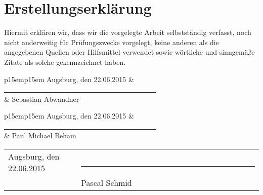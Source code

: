 \section*{Erstellungserklärung}
\vspace{2em}

Hiermit erklären wir, dass wir die vorgelegte Arbeit selbstständig verfasst, noch nicht anderweitig für Prüfungszwecke vorgelegt, keine anderen als die angegebenen Quellen oder Hilfsmittel verwendet sowie wörtliche und sinngemäße Zitate als solche gekennzeichnet haben.

\vspace{4em}
\begin{minipage}{\linewidth}
	\begin{tabular}{p{15em}p{15em}}
		Augsburg, den 22.06.2015 & 
		\underline{~~~~~~~~~~~~~~~~~~~~~~~~~~~~~~~~~~~~~~~~~~~}\\
		& 
		\centering Sebastian Abwandner
	\end{tabular}
\end{minipage}

\vspace{4em}
\begin{minipage}{\linewidth}
	\begin{tabular}{p{15em}p{15em}}
		Augsburg, den 22.06.2015 & 
		\underline{~~~~~~~~~~~~~~~~~~~~~~~~~~~~~~~~~~~~~~~~~~~}\\
		& 
		\centering Paul Michael Beham
	\end{tabular}
\end{minipage}

\vspace{4em}
\begin{minipage}{\linewidth}
	\begin{tabular}{p{15em}p{15em}}
		Augsburg, den 22.06.2015 & 
		\underline{~~~~~~~~~~~~~~~~~~~~~~~~~~~~~~~~~~~~~~~~~~~}\\
		& 
		\centering Pascal Schmid
	\end{tabular}
\end{minipage}

\pagebreak